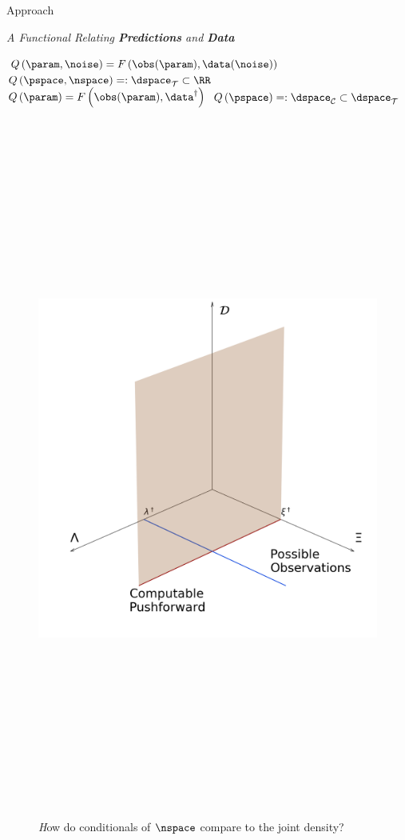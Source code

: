 \begin{block}{Approach}
\centering

\centering
\vspace{1cm}
    \emph{\large A Functional Relating \textbf{Predictions} and \textbf{Data}}
    \large
    \begin{itemize}
        $Q \left (\param, \noise \right ) = F \left ( \obs(\param), \data(\noise) \right )$
        $Q \left ( \pspace, \nspace \right ) =: \dspace_\mathcal{T} \subset \RR$
        $Q \left (\param \right ) = F \left ( \obs(\param), \data^\dagger \right )$
        $Q \left ( \pspace \right ) =: \dspace_\mathcal{C} \subset \dspace_\mathcal{T}$
    \end{itemize}
    \begin{figure}
        \includegraphics[height=23cm]{diagram}
    \caption*{\large \emph How do conditionals of $\nspace$ compare to the joint density?}
    \end{figure}



\end{block}
